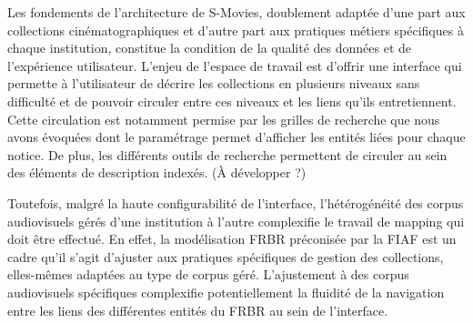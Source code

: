 Les fondements de l'architecture de S-Movies, doublement adaptée d’une part aux collections cinématographiques et d’autre part aux pratiques métiers spécifiques à chaque institution, constitue la condition de la qualité des données et de l’expérience utilisateur. L'enjeu de l'espace de travail est d'offrir une interface qui permette à l'utilisateur de décrire les collections en plusieurs niveaux sans difficulté et de pouvoir circuler entre ces niveaux et les liens qu’ils entretiennent. Cette circulation est notamment permise par les grilles de recherche que nous avons évoquées dont le paramétrage permet d’afficher les entités liées pour chaque notice. De plus, les différents outils de recherche permettent de circuler au sein des éléments de description indexés. (À développer ?) 

Toutefois, malgré la haute configurabilité de l’interface, l’hétérogénéité des corpus audiovisuels gérés d’une institution à l’autre complexifie le travail de mapping qui doit être effectué. En effet, la modélisation FRBR préconisée par la FIAF est un cadre qu’il s’agit d’ajuster aux pratiques spécifiques de gestion des collections, elles-mêmes adaptées au type de corpus géré. L’ajustement à des corpus audiovisuels spécifiques complexifie potentiellement la fluidité de la navigation entre les liens des différentes entités du FRBR au sein de l’interface.   









